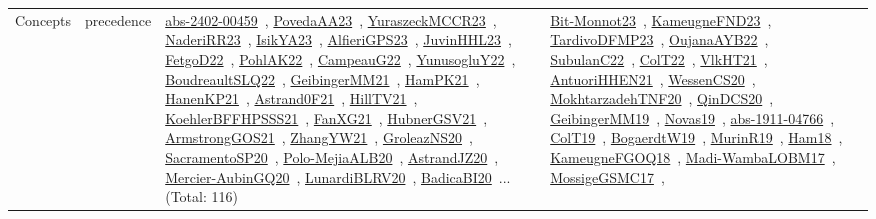 {\begin{longtable}{lp{3cm}>{\raggedright\arraybackslash}p{6cm}>{\raggedright\arraybackslash}p{6cm}>{\raggedright\arraybackslash}p{8cm}}
Concepts & precedence & \href{works/abs-2402-00459.pdf}{abs-2402-00459}~\cite{abs-2402-00459}, \href{works/PovedaAA23.pdf}{PovedaAA23}~\cite{PovedaAA23}, \href{works/YuraszeckMCCR23.pdf}{YuraszeckMCCR23}~\cite{YuraszeckMCCR23}, \href{works/NaderiRR23.pdf}{NaderiRR23}~\cite{NaderiRR23}, \href{works/IsikYA23.pdf}{IsikYA23}~\cite{IsikYA23}, \href{works/AlfieriGPS23.pdf}{AlfieriGPS23}~\cite{AlfieriGPS23}, \href{works/JuvinHHL23.pdf}{JuvinHHL23}~\cite{JuvinHHL23}, \href{works/FetgoD22.pdf}{FetgoD22}~\cite{FetgoD22}, \href{works/PohlAK22.pdf}{PohlAK22}~\cite{PohlAK22}, \href{works/CampeauG22.pdf}{CampeauG22}~\cite{CampeauG22}, \href{works/YunusogluY22.pdf}{YunusogluY22}~\cite{YunusogluY22}, \href{works/BoudreaultSLQ22.pdf}{BoudreaultSLQ22}~\cite{BoudreaultSLQ22}, \href{works/GeibingerMM21.pdf}{GeibingerMM21}~\cite{GeibingerMM21}, \href{works/HamPK21.pdf}{HamPK21}~\cite{HamPK21}, \href{works/HanenKP21.pdf}{HanenKP21}~\cite{HanenKP21}, \href{works/Astrand0F21.pdf}{Astrand0F21}~\cite{Astrand0F21}, \href{works/HillTV21.pdf}{HillTV21}~\cite{HillTV21}, \href{works/KoehlerBFFHPSSS21.pdf}{KoehlerBFFHPSSS21}~\cite{KoehlerBFFHPSSS21}, \href{works/FanXG21.pdf}{FanXG21}~\cite{FanXG21}, \href{works/HubnerGSV21.pdf}{HubnerGSV21}~\cite{HubnerGSV21}, \href{works/ArmstrongGOS21.pdf}{ArmstrongGOS21}~\cite{ArmstrongGOS21}, \href{works/ZhangYW21.pdf}{ZhangYW21}~\cite{ZhangYW21}, \href{works/GroleazNS20.pdf}{GroleazNS20}~\cite{GroleazNS20}, \href{works/SacramentoSP20.pdf}{SacramentoSP20}~\cite{SacramentoSP20}, \href{works/Polo-MejiaALB20.pdf}{Polo-MejiaALB20}~\cite{Polo-MejiaALB20}, \href{works/AstrandJZ20.pdf}{AstrandJZ20}~\cite{AstrandJZ20}, \href{works/Mercier-AubinGQ20.pdf}{Mercier-AubinGQ20}~\cite{Mercier-AubinGQ20}, \href{works/LunardiBLRV20.pdf}{LunardiBLRV20}~\cite{LunardiBLRV20}, \href{works/BadicaBI20.pdf}{BadicaBI20}~\cite{BadicaBI20}... (Total: 116) & \href{works/Bit-Monnot23.pdf}{Bit-Monnot23}~\cite{Bit-Monnot23}, \href{works/KameugneFND23.pdf}{KameugneFND23}~\cite{KameugneFND23}, \href{works/TardivoDFMP23.pdf}{TardivoDFMP23}~\cite{TardivoDFMP23}, \href{works/OujanaAYB22.pdf}{OujanaAYB22}~\cite{OujanaAYB22}, \href{works/SubulanC22.pdf}{SubulanC22}~\cite{SubulanC22}, \href{works/ColT22.pdf}{ColT22}~\cite{ColT22}, \href{works/VlkHT21.pdf}{VlkHT21}~\cite{VlkHT21}, \href{works/AntuoriHHEN21.pdf}{AntuoriHHEN21}~\cite{AntuoriHHEN21}, \href{works/WessenCS20.pdf}{WessenCS20}~\cite{WessenCS20}, \href{works/MokhtarzadehTNF20.pdf}{MokhtarzadehTNF20}~\cite{MokhtarzadehTNF20}, \href{works/QinDCS20.pdf}{QinDCS20}~\cite{QinDCS20}, \href{works/GeibingerMM19.pdf}{GeibingerMM19}~\cite{GeibingerMM19}, \href{works/Novas19.pdf}{Novas19}~\cite{Novas19}, \href{works/abs-1911-04766.pdf}{abs-1911-04766}~\cite{abs-1911-04766}, \href{works/ColT19.pdf}{ColT19}~\cite{ColT19}, \href{works/BogaerdtW19.pdf}{BogaerdtW19}~\cite{BogaerdtW19}, \href{works/MurinR19.pdf}{MurinR19}~\cite{MurinR19}, \href{works/Ham18.pdf}{Ham18}~\cite{Ham18}, \href{works/KameugneFGOQ18.pdf}{KameugneFGOQ18}~\cite{KameugneFGOQ18}, \href{works/Madi-WambaLOBM17.pdf}{Madi-WambaLOBM17}~\cite{Madi-WambaLOBM17}, \href{works/MossigeGSMC17.pdf}{MossigeGSMC17}~\cite{MossigeGSMC17}, 
\end{longtable}}
